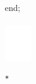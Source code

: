 \documentclass[10pt]{article}
\begin{document}
end;\\
$\qquad$\\
\includegraphics[max width=\textwidth, center]{2025_04_17_46e04c6acd873ea9558dg-016(1)}

\begin{verbatim}
*
\end{verbatim}
\end{document}
